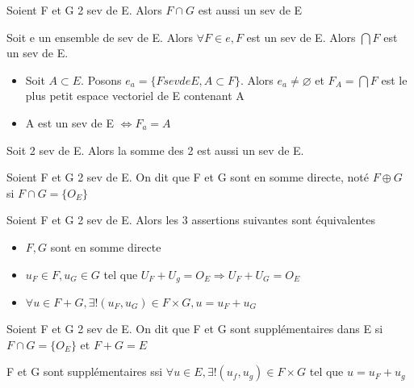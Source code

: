 \documentclass[french]{yLectureNote}
\begin{document}
\begin{proposition}
Soient F et G 2 sev de E. Alors \( F \cap G\) est aussi un sev de E

Soit e un ensemble de sev de E. Alors \(\forall F\in e, F\) est un sev de E. Alors \(\bigcap F\) est un sev de E.
\end{proposition}
\begin{proposition}[Corollaire]
\begin{itemize}
 \item Soit \(A\subset E\). Posons \(e_a = \{F sev de E,A\subset F\}\). Alors \(e_a \neq \varnothing\) et \(F_A = \bigcap F\) est le plus petit espace vectoriel de E contenant A
 \item A est un sev de E \(\iff F_a = A\)
\end{itemize}
\end{proposition}
\begin{proposition}
Soit 2 sev de E. Alors la somme des 2 est aussi un sev de E.
\end{proposition}
\begin{definition}
Soient F et G 2 sev de E. On dit que F et G sont en somme directe, noté \(F\oplus G\) si \(F\cap G = \{O_E\}\)
\end{definition}
\begin{proposition}
Soient F et G 2 sev de E. Alors les 3 assertions suivantes sont équivalentes
\begin{itemize}
 \item \(F, G\) sont en somme directe
 \item \(u_F\in F, u_G\in G\) tel que \(U_F+U_g = O_E \Rightarrow U_F+U_G = O_E\)
 \item \(\forall u\in F+G, \exists! (u_F,u_G)\in F \times G, u = u_F+u_G\)
\end{itemize}
\end{proposition}
\begin{definition}
Soient F et G 2 sev de E. On dit que F et G sont supplémentaires dans E si \(F\cap G = \{O_E\}\) et \(F+G = E\)
\end{definition}
\begin{proposition}
F et G sont supplémentaires ssi \(\forall u\in E, \exists ! (u_f,u_g)\in F\times G\) tel que \(u=u_F+u_g\)
\end{proposition}
\end{document}
